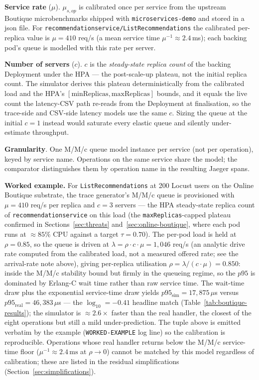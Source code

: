 \documentclass[ASNA,twocolumn]{USG}
\begin{document}
    \textbf{Service rate} ($\mu$). $\mu_{s,op}$ is calibrated once per
    service from the upstream Boutique microbenchmarks shipped with
    \texttt{microservices-demo} and stored in a json file.
    For \texttt{recommendationservice/ListRecommendations} the calibrated
    per-replica value is $\mu = 410$ req/s (a mean service time
    $\mu^{-1} \approx 2.4\,$ms); each backing pod's queue is modelled with
    this rate per server.

    \textbf{Number of servers} ($c$). $c$ is the \emph{steady-state replica
    count} of the backing Deployment under the HPA --- the post-scale-up
    plateau, not the initial replica count. The simulator derives this
    plateau deterministically from the calibrated load and the HPA's
    $[\textrm{minReplicas}, \textrm{maxReplicas}]$ bounds, and it equals
    the live count the latency-CSV path re-reads from the Deployment at
    finalisation, so the trace-side and CSV-side latency models use the
    same $c$. Sizing the queue at the initial $c{=}1$ instead would
    saturate every elastic queue and silently under-estimate throughput.

    \textbf{Granularity}. One M/M/c queue model instance per service
    (not per operation), keyed by service name. Operations on the same
    service share the model; the comparator distinguishes them by
    operation name in the resulting Jaeger spans.

    \textbf{Worked example.} For \texttt{ListRecommendations} at
    200 Locust users on the Online Boutique substrate, the trace
    generator's M/M/c queue is provisioned with $\mu = 410$ req/s per
    replica and $c = 3$ servers --- the HPA steady-state replica count of
    \texttt{recommendationservice} on this load (the
    \texttt{maxReplicas}-capped plateau confirmed in
    Sections~\ref{sec:threats} and~\ref{sec:online-boutique}, where each
    pod runs at $\approx\!85\%$ CPU against a target $\tau = 0.70$). The
    per-pod load is held at $\rho = 0.85$, so the queue is driven at
    $\lambda = \rho \cdot c \cdot \mu = 1{,}046$ req/s (an analytic drive
    rate computed from the calibrated load, not a measured offered rate;
    see the arrival-rate note above), giving per-replica utilisation
    $\rho = \lambda / (c \cdot \mu) = 0.850$: inside the M/M/c stability
    bound but firmly in the queueing regime, so the $p95$ is dominated by
    Erlang-C wait time rather than raw service time. The wait-time draw
    plus the exponential service-time draw yields $p95_\textrm{sim} =
    17{,}875\,\mu$s versus $p95_\textrm{real} = 46{,}383\,\mu$s ---
    the $\log_{10} = -0.41$ headline match
    (Table~\ref{tab:boutique-results}); the simulator is $\approx\!2.6\times$
    faster than the real handler, the closest of the eight operations but
    still a mild under-prediction. The tuple above is emitted verbatim by
    the example (\texttt{WORKED-EXAMPLE} log line) so the calibration is
    reproducible. Operations whose real handler returns below the M/M/c
    service-time floor ($\mu^{-1} \approx 2.4\,\textrm{ms}$ at
    $\rho \to 0$) cannot be matched by this model regardless of
    calibration; these are listed in the residual simplifications
    (Section~\ref{sec:simplifications}).
\end{document}
